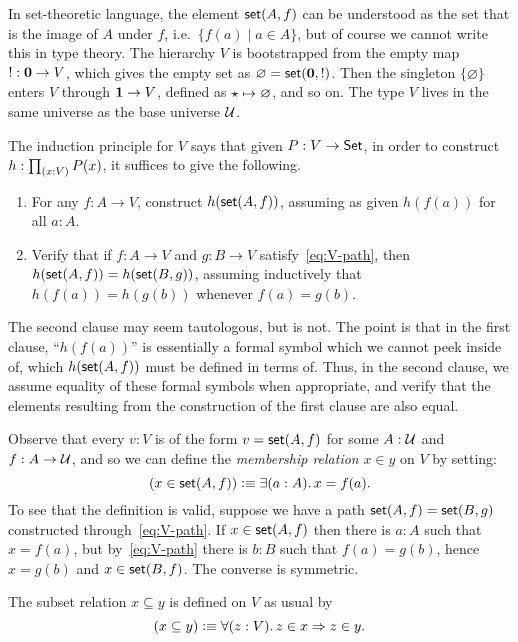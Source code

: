 In set-theoretic language, the element $\mathsf{set}(A,f)$ can be understood as the set that is the image of $A$ under $f$, i.e.\ $\{ f(a) \mid a
\in A \}$, but of course we cannot write this in type theory. The hierarchy $V$ is
bootstrapped from the empty map $! : \mathbf{0} \to V$, which gives the empty set as $\varnothing = \mathsf{set}(\mathbf{0},!)$.
Then the singleton $\{\varnothing\}$ enters $V$ through $\mathbf{1} \to V$, defined as $\star \mapsto \varnothing$, and so
on. The type $V$ lives in the same universe as the base universe $\mathcal{U}$.

The induction principle for $V$ says that given $P:V\to \mathsf{Set}$, in order to construct $h:\prd{x:V} P(x)$, it suffices to give the following.
\begin{enumerate}
\item For any $f:A\to V$, construct $h(\mathsf{set}(A,f))$, assuming as given $h(f(a))$ for all $a:A$.
\item Verify that if $f : A \to V$ and $g : B \to V$ satisfy~\eqref{eq:V-path}, then $h(\mathsf{set}(A,f)) = h(\mathsf{set}(B,g))$, assuming inductively that $h(f(a)) = h(g(b))$ whenever $f(a)=g(b)$.
\end{enumerate}
The second clause may seem tautologous, but is not.
The point is that in the first clause, ``$h(f(a))$'' is essentially a formal symbol which we cannot peek inside of, which $h(\mathsf{set}(A,f))$ must be defined in terms of. Thus, in the second clause, we assume equality of these formal symbols when appropriate, and verify that the elements resulting from the construction of the first clause are also equal.

Observe that every $v:V$ is of the form $v=\mathsf{set}(A,f)$ for some $A:\mathcal{U}$ and $f:A\to\mathcal{U}$, and so we can define the \emph{membership relation} $x\in y$ on $V$ by setting:
%
\begin{equation*}
  (x \in \vset(A,f)) \defeq \exis{a : A} x = f(a).
\end{equation*}
%
To see that the definition is valid, suppose we have a path $\mathsf{set}(A, f) = \mathsf{set}(B, g)$
constructed through~\eqref{eq:V-path}. If $x \in \mathsf{set}(A,f)$ then there is $a : A$ such
that $x = f(a)$, but by~\eqref{eq:V-path} there is $b : B$ such that $f(a) = g(b)$, hence
$x = g(b)$ and $x \in \mathsf{set}(B,f)$. The converse is symmetric.


The subset relation $x\subseteq y$ is defined on $V$ as usual by
%
\begin{equation*}
  (x \subseteq y) \defeq \fall{z : V} z \in x \Rightarrow z \in y.
\end{equation*}

